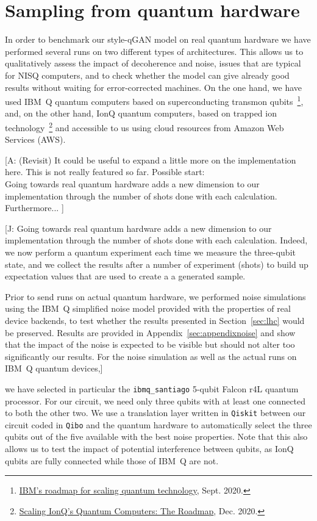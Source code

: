 \documentclass[twocolumn,preprintnumbers,superscriptaddress]{revtex4-2}
\newcommand{\commentJB}[1]{{\color{blue} {[J: #1]}}}
\newcommand{\commentAF}[1]{{\color{cyan} {[A: #1]}}}
\begin{document}
\section{Sampling from quantum hardware}
\label{sec:deployment}

In order to benchmark our style-qGAN model on real quantum hardware we
have performed several runs on two different types of
architectures. This allows us to qualitatively assess the impact of
decoherence and noise, issues that are typical for NISQ computers, and
to check whether the model can give already good results without
waiting for error-corrected machines. On the one hand, we have used IBM~Q
quantum computers based on superconducting transmon
qubits~\footnote{\href{https://research.ibm.com/blog/ibm-quantum-roadmap}{IBM's roadmap for scaling quantum technology}, Sept. 2020.}, and, on the other hand, IonQ quantum computers, based on trapped ion technology~\footnote{\href{https://IonQ.com/posts/december-09-2020-scaling-quantum-computer-roadmap}{Scaling IonQ's Quantum Computers: The Roadmap}, Dec. 2020.} and
accessible to us using cloud resources from Amazon Web Services
(AWS).

\commentAF{(Revisit) It could be useful to expand a little more on the implementation here. This is not really featured so far. Possible start:\\
 Going towards real quantum hardware adds a new dimension to our implementation through the number of shots done with each calculation. Furthermore...
 }

\commentJB{
 Going towards real quantum hardware adds a new dimension to our implementation through the number of shots done with each calculation. Indeed, we
 now perform a quantum experiment each time we measure the three-qubit state, and we collect the results after a number of experiment (shots) to build
 up expectation values that are used to create a a generated sample.

 Prior to send runs on actual quantum hardware, we performed noise simulations using the
IBM~Q simplified noise model provided with the properties of real device backends, to test whether
the results presented in Section~\ref{sec:lhc} would be preserved. Results are provided in Appendix~\ref{sec:appendixnoise}
and show that the impact of the noise is expected to be visible but should not alter too significantly our
results. For the noise simulation as well as the actual runs on IBM~Q quantum devices,}
we have selected in particular the {\tt ibmq\_santiago} 5-qubit Falcon r4L quantum processor.
For our circuit, we need only three qubits with at least one connected to both the other two.
We use a translation layer written in \texttt{Qiskit} between our circuit coded in \texttt{Qibo}
and the quantum hardware to automatically select the three qubits out of the five available
with the best noise properties. Note that this also allows us to test the impact of potential
interference between qubits, as IonQ qubits are fully connected while those of IBM~Q are not.
\end{document}
